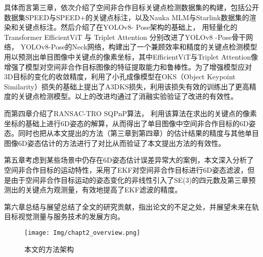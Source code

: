 具体而言第三章，依次介绍了空间非合作目标关键点检测数据集的构建，包括公开数据集SPEED与SPEED+的关键点标注，以及Nauka MLM与Starlink数据集的渲染和关键点标注。然后介绍了在YOLOv8-  Pose架构的基础上， 用轻量化的Transformer EfficientViT 与 Triplet Attention 分别改进了YOLOv8 -Pose骨干网络， YOLOv8-Pose的Neck网络，构建出了一个兼顾效率和精度的关键点检测模型用以预测出单目图像中关键点的像素坐标，其中EfficientViT与Triplet Attention像增强了模型对空间非合作目标图像的特征提取能力和鲁棒性。为了增强模型应对3D目标的变化的收敛精度，利用了小孔成像模型在OKS（Object Keypoint Similarity）损失的基础上提出了A3DKS损失，利用该损失有效的训练出了更高精度的关键点检测模型。以上的改进均通过了消融实验验证了改进的有效性。

而第四章介绍了RANSAC-TRO SQPnP算法， 利用该算法在求出的关键点的像素坐标的基础上进行6D姿态的解算，从而得出了单目图像中空间非合作目标的6D姿态。同时也把从本文提出的方法（第三章到第四章）的估计结果的精度与其他单目图像6D姿态估计的方法进行了对比从而验证了本文提出方法的有效性。

第五章考虑到某些场景中仍存在6D姿态估计误差异常大的案例，本文深入分析了空间非合作目标的运动特性，采用了EKF对空间非合作目标进行6D姿态滤波，但是由于空间非合作目标运动的姿态变化的非线性引入了SE(3)的四元数及第三章预测出的关键点为观测量，有效地提高了EKF滤波的精度。


第六章总结与展望总结了全文的研究贡献，指出论文的不足之处，并展望未来在轨目标视觉测量与服务技术的发展方向。

\begin{figure}[htbp]
	\centering
	\texttt{[image: Img/chapt2\_overview.png]}
	\caption{本文的方法架构}
	\label{fig:6D_pose_estimation_archieture}
\end{figure}
